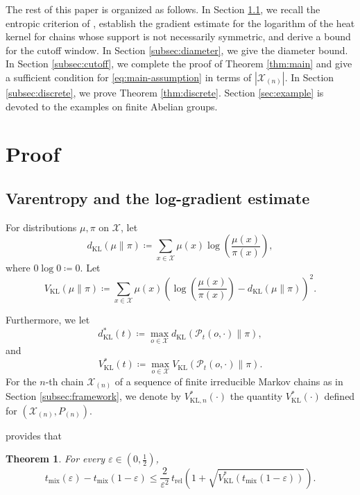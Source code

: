 \documentclass[a4paper, reqno, 11pt]{amsart}
\newtheorem{Thm}{Theorem}[section]
\theoremstyle{definition}
\begin{document}
The rest of this paper is organized as follows.
In Section \ref{subsec:varentropy}, we recall the entropic criterion of \cite{Salez2024}, establish the gradient estimate for the logarithm of the heat kernel for chains whose support is not necessarily symmetric, and derive a bound for the cutoff window.
In Section \ref{subsec:diameter}, we give the diameter bound.
In Section \ref{subsec:cutoff}, we complete the proof of Theorem \ref{thm:main} and give a sufficient condition for \eqref{eq:main-assumption} in terms of $|\mathcal{X}_{(n)}|$.
In Section \ref{subsec:discrete}, we prove Theorem \ref{thm:discrete}.
Section \ref{sec:example} is devoted to the examples on finite Abelian groups.


\section{Proof}\label{sec:proof}

\subsection{Varentropy and the log-gradient estimate}\label{subsec:varentropy}

For distributions $\mu,\pi$  on $\mathcal{X}$, let 
\[ d_{\mathrm{KL}}(\mu\|\pi) \coloneqq  \sum_{x\in\mathcal{X}} \mu(x)\log\!\left(\frac{\mu(x)}{\pi(x)}\right), \]
where $0\log 0 \coloneqq  0$. 
Let 
\[ V_{\mathrm{KL}}(\mu\|\pi) \coloneqq  \sum_{x\in\mathcal{X}} \mu(x) \left(\log\!\left(\frac{\mu(x)}{\pi(x)}\right) - d_{\mathrm{KL}}(\mu\|\pi) \right)^{2}. \]

Furthermore, we let 
\[ d_{\mathrm{KL}}^{*}(t) \coloneqq  \max_{o\in\mathcal{X}} d_{\mathrm{KL}}\!\left(\mathscr{P}_t(o,\cdot)\|\pi\right),  \] 
and 
\[ V_{\mathrm{KL}}^{*}(t)\coloneqq  \max_{o\in\mathcal{X}} V_{\mathrm{KL}}\!\left(\mathscr{P}_{t}(o,\cdot)\|\pi\right). \]
For the $n$-th chain $\mathcal{X}_{(n)}$ of a sequence of finite irreducible Markov chains as in Section \ref{subsec:framework},
we denote by $V_{\mathrm{KL},n}^{*}(\cdot)$ the quantity $V_{\mathrm{KL}}^{*}(\cdot)$ defined for $(\mathcal{X}_{(n)}, P_{(n)})$.

\cite[Theorem 5]{Salez2024} provides that
\begin{Thm}\label{thm:Thm5Salez}
For every $\varepsilon \in (0,\tfrac{1}{2})$,
\[ t_{\mathrm{mix}}(\varepsilon) - t_{\mathrm{mix}}(1-\varepsilon) \le
\frac{2}{\varepsilon^{2}}\,t_{\mathrm{rel}}
\left(1+\sqrt{V_{\mathrm{KL}}^{*}\!\left(t_{\mathrm{mix}}(1-\varepsilon)\right)}\right). \]
\end{Thm}
\end{document}
